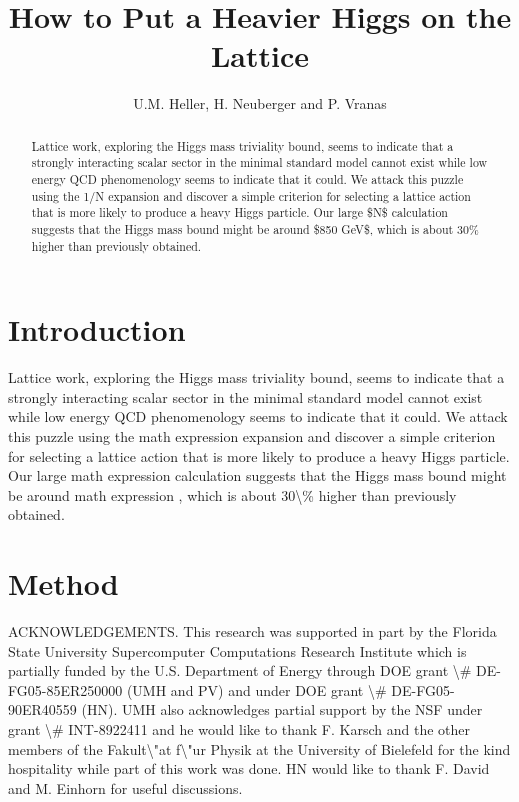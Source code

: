 \documentclass[11pt]{article}
\title{How to Put a Heavier Higgs on the Lattice}
\author{U.M. Heller, H. Neuberger and P. Vranas}
\date{}
\begin{document}
\maketitle
\begin{abstract}

Lattice work, exploring the Higgs mass triviality bound, seems to indicate that a strongly interacting scalar sector in the minimal standard model cannot exist while low energy QCD phenomenology seems to indicate that it could. We attack this puzzle using the 1/N expansion and discover a simple criterion for selecting a lattice action that is more likely to produce a heavy Higgs particle. Our large \$N\$ calculation suggests that the Higgs mass bound might be around \$850 GeV\$, which is about 30\% higher than previously obtained.

\end{abstract}

\section{Introduction}

Lattice work, exploring the Higgs mass triviality bound, seems to indicate that a strongly interacting scalar sector in the minimal standard model cannot exist while low energy QCD phenomenology seems to indicate that it could. We attack this puzzle using the math expression expansion and discover a simple criterion for selecting a lattice action that is more likely to produce a heavy Higgs particle. Our large math expression calculation suggests that the Higgs mass bound might be around math expression , which is about 30\textbackslash{}\% higher than previously obtained.

\section{Method}

ACKNOWLEDGEMENTS. This research was supported in part by the Florida State University Supercomputer Computations Research Institute which is partially funded by the U.S. Department of Energy through DOE grant \textbackslash{}\# DE-FG05-85ER250000 (UMH and PV) and under DOE grant \textbackslash{}\# DE-FG05-90ER40559 (HN). UMH also acknowledges partial support by the NSF under grant \textbackslash{}\# INT-8922411 and he would like to thank F. Karsch and the other members of the Fakult\textbackslash{}"at f\textbackslash{}"ur Physik at the University of Bielefeld for the kind hospitality while part of this work was done. HN would like to thank F. David and M. Einhorn for useful discussions.
\end{document}
